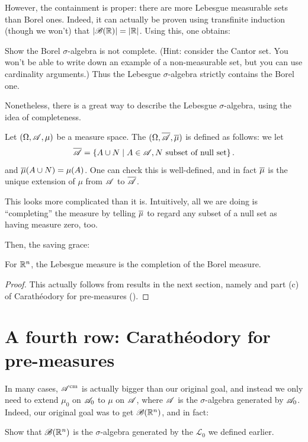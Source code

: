 However, the containment is proper:
there are more Lebesgue measurable sets than Borel ones.
Indeed, it can actually be proven using transfinite induction
(though we won't) that
$\left\lvert \mathscr B(\mathbb R) \right\rvert = \left\lvert \mathbb R \right\rvert$.
Using this, one obtains:
\begin{exercise}
	Show the Borel $\sigma$-algebra is not complete.
	(Hint: consider the Cantor set.
	You won't be able to write down an example of a non-measurable
	set, but you can use cardinality arguments.)
	Thus the Lebesgue $\sigma$-algebra strictly contains the Borel one.
\end{exercise}

Nonetheless, there is a great way to describe the Lebesgue $\sigma$-algebra,
using the idea of completeness.
\begin{definition}
	Let $(\Omega, \mathscr A, \mu)$ be a measure space.
	The  $(\Omega, \overline{\mathscr A}, \overline{\mu})$
	is defined as follows:
	we let
	\[ \overline{\mathscr A} = \left\{ A \cup N \mid A \in \mathscr A,
		N \text{ subset of null set} \right\}. \]
	and $\overline{\mu}(A \cup N) = \mu(A)$.
	One can check this is well-defined,
	and in fact $\overline{\mu}$ is the unique extension
	of $\mu$ from $\mathscr A$ to $\overline{\mathscr A}$.

	This looks more complicated than it is.
	Intuitively, all we are doing is ``completing'' the measure
	by telling $\overline{\mu}$ to regard any subset of a null set
	as having measure zero, too.
\end{definition}

Then, the saving grace:
\begin{theorem}
	For $\mathbb R^n$, the Lebesgue measure is the completion of the Borel measure.
\end{theorem}
\begin{proof}
	This actually follows from results in the next section,
	namely 
	and part (c) of Carath\'{e}odory for pre-measures ().
\end{proof}

\section{A fourth row: Carath\'{e}odory for pre-measures}
In many cases, $\mathscr A^\text{cm}$ is actually bigger than our original goal,
and instead we only need to extend $\mu_0$ on $\mathscr A_0$
to $\mu$ on $\mathscr A$, where $\mathscr A$ is the $\sigma$-algebra generated by $\mathscr A_0$.
Indeed, our original goal was to get $\mathscr B(\mathbb R^n)$, and in fact:
\begin{exercise}
	Show that $\mathscr B(\mathbb R^n)$ is the $\sigma$-algebra generated
	by the $\mathcal{L}_0$ we defined earlier.
	\label{exer:cubes_vs_open}
\end{exercise}

